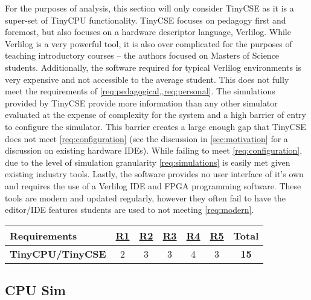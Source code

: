 For the purposes of analysis, this section will only consider TinyCSE as it is a super-set of TinyCPU functionality. TinyCSE focuses on pedagogy first and foremost, but also focuses on a hardware descriptor language, Verlilog. While Verlilog is a very powerful tool, it is also over complicated for the purposes of teaching introductory courses -- the authors focused on Masters of Science students. Additionally, the software required for typical Verlilog environments is very expensive and not accessible to the average student. This does not fully meet the requirements of \cref{req:pedagogical,,req:personal}. The simulations provided by TinyCSE provide more information than any other simulator evaluated at the expense of complexity for the system and a high barrier of entry to configure the simulator. This barrier creates a large enough gap that TinyCSE does not meet \cref{req:configuration} (see the discussion in \cref{sec:motivation} for a discussion on existing hardware IDEs). While failing to meet \cref{req:configuration}, due to the level of simulation granularity \cref{req:simulations} is easily met given existing industry tools. Lastly, the software provides no user interface of it's own and requires the use of a Verlilog IDE and FPGA programming software. These tools are modern and updated regularly, however they often fail to have the editor/IDE features students are used to not meeting \cref{req:modern}.

\begin{table}[h!]
    \centering
    \begin{tabular}{lcccccc}
        \textbf{Requirements} & \textbf{\hyperref[req:personal]{R1}} & \textbf{\hyperref[req:configuration]{R2}} & \textbf{\hyperref[req:pedagogical]{R3}} & \textbf{\hyperref[req:simulations]{R4}} & \textbf{\hyperref[req:modern]{R5}} & \textbf{Total} \\ \hline
        \textbf{TinyCPU/TinyCSE} & 2                                  & 3                                    & 3                            & 4                                  & 3                             & \textbf{15}    \\ 
    \end{tabular}
\end{table}

\subsection{CPU Sim}
\label{sec:review-cpu-sim}

